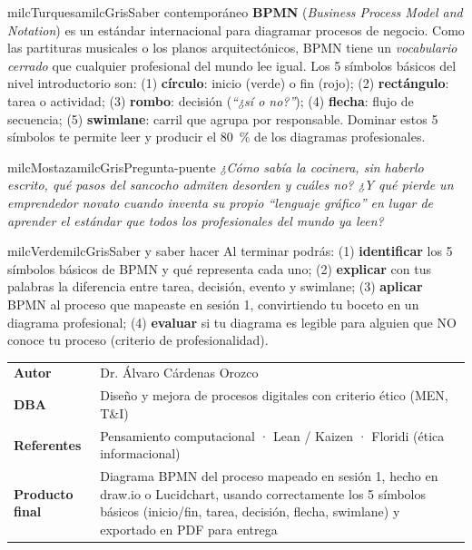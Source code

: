 \documentclass[11pt,letterpaper]{article}
\begin{document}
\begin{softbox}{milcTurquesa}{milcGris}{Saber contemporáneo}
\textbf{BPMN} (\emph{Business Process Model and Notation}) es un estándar internacional para diagramar procesos de negocio. Como las partituras musicales o los planos arquitectónicos, BPMN tiene un \emph{vocabulario cerrado} que cualquier profesional del mundo lee igual. Los 5 símbolos básicos del nivel introductorio son: (1) \textbf{círculo}: inicio (verde) o fin (rojo); (2) \textbf{rectángulo}: tarea o actividad; (3) \textbf{rombo}: decisión (\emph{``¿sí o no?''}); (4) \textbf{flecha}: flujo de secuencia; (5) \textbf{swimlane}: carril que agrupa por responsable. Dominar estos 5 símbolos te permite leer y producir el 80~\% de los diagramas profesionales.
\end{softbox}

\begin{softbox}{milcMostaza}{milcGris}{Pregunta-puente}
\textit{¿Cómo sabía la cocinera, sin haberlo escrito, qué pasos del sancocho admiten desorden y cuáles no? ¿Y qué pierde un emprendedor novato cuando inventa su propio \emph{``lenguaje gráfico''} en lugar de aprender el estándar que todos los profesionales del mundo ya leen?}
\end{softbox}

\begin{softbox}{milcVerde}{milcGris}{Saber y saber hacer}
Al terminar podrás: (1) \textbf{identificar} los 5 símbolos básicos de BPMN y qué representa cada uno; (2) \textbf{explicar} con tus palabras la diferencia entre tarea, decisión, evento y swimlane; (3) \textbf{aplicar} BPMN al proceso que mapeaste en sesión 1, convirtiendo tu boceto en un diagrama profesional; (4) \textbf{evaluar} si tu diagrama es legible para alguien que NO conoce tu proceso (criterio de profesionalidad).
\end{softbox}



\small
\begin{tabularx}{\textwidth}{>{\bfseries}p{3.0cm}Y}
Autor & Dr. Álvaro Cárdenas Orozco\\
DBA & Diseño y mejora de procesos digitales con criterio ético (MEN, T\&I)\\
Referentes & Pensamiento computacional · Lean / Kaizen · Floridi (ética informacional)\\
Producto final & Diagrama BPMN del proceso mapeado en sesión 1, hecho en draw.io o Lucidchart, usando correctamente los 5 símbolos básicos (inicio/fin, tarea, decisión, flecha, swimlane) y exportado en PDF para entrega\\
\end{tabularx}
\normalsize
\end{document}
